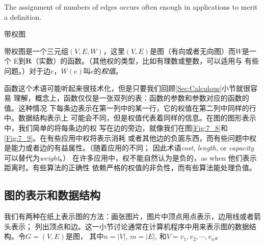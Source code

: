 The assignment of numbers of edges occurs often enough in applications to
merit a definition.

\begin{definition}
带权图

带权图是一个三元组$(V,E,W)$，这里$(V,E)$是图（有向或者无向图）而$W$是一个
E到$\mathbf{R}$（实数）的函数。（其他权的类型，比如有理数或整数，可以适用与
有些问题。）对于边$e$，$W(e)$叫$e$的\emph{权值}。
\end{definition}

函数这个术语可能听起来很技术化，但是只要我们回顾\ref{Sec:Calculous}小节就很容易
理解，概念上，函数仅仅是一张双列的表：函数的参数和参数对应的函数的值。这种情况
下每条边表示在第一列中的某一行，它的权值在第二列中同样的行中。数据结构表示上
可能会不同，但是权值代表着同样的信息。在图的图形表示中，我们简单的将每条边的权
写在边的旁边，就像我们在图\ref{Fig:7_8}和\ref{Fig:7_9}。在有些应用中权将表示消耗
或者其他边的负面东西，而有些问题中权是能力或者边的有益属性。（随着应用的不同；
因此术语\emph{cost}, \emph{length}, or \emph{capacity} 可以替代为\emph{weight}。）
在许多应用中，权不能自然认为是负的，as when 他们表示距离时。有些算法的正确性
依赖严格的权值的非负性，而有些算法能处理负值。


\subsection{图的表示和数据结构}\label{Sec:GraphRepresentationsAndDataStructures}
我们有两种在纸上表示图的方法：画张图片，图片中顶点用点表示，边用线或者箭头表示；
列出顶点和边。这一小节讨论通常在计算机程序中用来表示图的数据结构。令$G=(V,E)$是图，
其中$n=|V|$, $m=|E|$, 和$V={v_1, v_2, \cdots, v_n}$。

